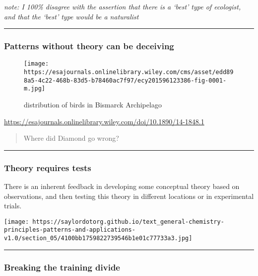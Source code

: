 \documentclass[
]{article}
\begin{document}
\emph{note: I 100\% disagree with the assertion that there is a `best'
type of ecologist, and that the `best' type would be a naturalist}

\begin{center}\rule{0.5\linewidth}{0.5pt}\end{center}

\hypertarget{patterns-without-theory-can-be-deceiving}{%
\subsubsection{Patterns without theory can be
deceiving}\label{patterns-without-theory-can-be-deceiving}}

\begin{figure}
\centering
\texttt{[image: https://esajournals.onlinelibrary.wiley.com/cms/asset/edd898a5-4c22-468b-83d5-b78460ac7f97/ecy201596123386-fig-0001-m.jpg]}
\caption{distribution of birds in Bismarck Archipelago}
\end{figure}

\url{https://esajournals.onlinelibrary.wiley.com/doi/10.1890/14-1848.1}

\begin{quote}
Where did Diamond go wrong?
\end{quote}

\begin{center}\rule{0.5\linewidth}{0.5pt}\end{center}

\hypertarget{theory-requires-tests}{%
\subsubsection{Theory requires tests}\label{theory-requires-tests}}

There is an inherent feedback in developing some conceptual theory based
on observations, and then testing this theory in different locations or
in experimental trials.

\texttt{[image: https://saylordotorg.github.io/text\_general-chemistry-principles-patterns-and-applications-v1.0/section\_05/4100bb1759822739546b1e01c77733a3.jpg]}

\begin{center}\rule{0.5\linewidth}{0.5pt}\end{center}

\hypertarget{breaking-the-training-divide}{%
\subsubsection{Breaking the training
divide}\label{breaking-the-training-divide}}
\end{document}
